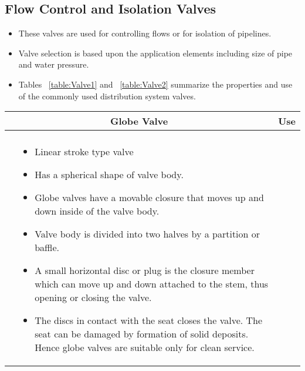 \subsection{Flow Control and Isolation Valves}
\begin{itemize}
\item These valves are used for controlling flows or for isolation of pipelines.
\item Valve selection is based upon the application elements including size of pipe and water pressure.
\item Tables ~\ref{table:Valve1} and ~\ref{table:Valve2} summarize the properties and use of the commonly used distribution system valves. 
\end{itemize}
\newpage
\thispagestyle{empty}
   \vspace{-2em} 
\begin{landscape}
\begin{table}
  \centering
  \begin{tabular}{| m{7cm} m{10cm} | m{7cm} | }
    \hline
\multicolumn{2}{c}{Globe Valve} & \multicolumn{1}{c}{Use} \\ \hline
    \begin{minipage}{.5\textwidth}
    \begin{center}
    \hspace{0.5cm}
     \texttt{[image: GlobeValve1]}\\
     \end{center}
    \end{minipage}
    &
  \scriptsize{\begin{itemize}[topsep=5pt, partopsep=0pt]
  \item Linear stroke type valve \item Has a spherical shape of valve body. \item Globe valves have a movable closure that moves up and down inside of the valve body. \item Valve body is divided into two halves by a partition or baffle.  \item A small horizontal disc or plug is the closure member which can move up and down attached to the stem, thus opening or closing the valve. \item The discs in contact with the seat closes the valve. The seat can be damaged by formation of solid deposits. Hence globe valves are suitable only for clean service.

\end{itemize}}
\end{tabular}
\end{table}
\end{landscape}
